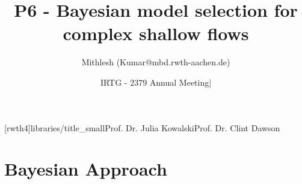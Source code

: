 \documentclass[t, aspectratio=169]{beamer}
\title{P6 - Bayesian model selection for complex shallow flows }
\subtitle{\vspace{0cm}} %
\date{IRTG - 2379 Annual Meeting\enskip|\enskip\displaydate{dateOfPresentation}}
\author[Mithlesh]{Mithlesh (Kumar@mbd.rwth-aachen.de)}
\institute[RWTH]{RWTH Aachen University}
\begin{document}






[rwth4]{libraries/title_small}{Prof. Dr. Julia Kowalski}{Prof. Dr. Clint Dawson}
\begin{frame}[plain]
	\titlepage 
\end{frame}



\section{Bayesian Approach}
\end{document}
